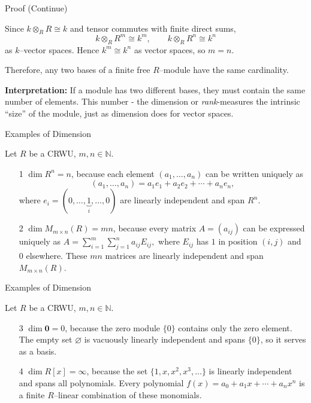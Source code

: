 \documentclass[11pt,aspectratio=43,ignorenonframetext,t]{beamer}
\begin{document}
\begin{frame}{Proof (Continue) }
\begin{block}{}
Since $k\otimes_R R \cong k$ and tensor commutes with finite direct sums,
\[
k \otimes_R R^m \cong k^m,\qquad k \otimes_R R^n \cong k^n
\]
as $k$–vector spaces. Hence $k^m \cong k^n$ as vector spaces, so $m=n$.

Therefore, any two bases of a finite free $R$–module have the same cardinality.     
\end{block}

\textbf{Interpretation:}  
If a module has two different bases, they must contain the same number of elements. This number - the dimension or \emph{rank}-measures the intrinsic “size” of the module, just as dimension does for vector spaces.


\end{frame}

\begin{frame}{Examples of Dimension}

\begin{block}{Let $R$ be a CRWU, $m,n\in\mathbb{N}$.}
    \begin{enumerate}
  \item[1] $\dim R^n = n$, because each element $(a_1,\dots,a_n)$ can be written uniquely as  
  \[
  (a_1,\dots,a_n) = a_1 e_1 + a_2 e_2 + \cdots + a_n e_n,
  \]
  where $e_i=(0,\dots,\underbrace{1}_{i},\dots,0)$ are linearly independent and span $R^n$.

  \item[2] $\dim M_{m\times n}(R) = mn$, because every matrix $A=(a_{ij})$ can be expressed uniquely as  
    $A = \sum_{i=1}^m \sum_{j=1}^n a_{ij}E_{ij},$
  where $E_{ij}$ has $1$ in position $(i,j)$ and $0$ elsewhere. These $mn$ matrices are linearly independent and span $M_{m\times n}(R)$.
\end{enumerate}
\end{block}
\end{frame}

\begin{frame}{Examples of Dimension}
\begin{block}{Let $R$ be a CRWU, $m,n\in\mathbb{N}$.}
\begin{enumerate}
  \item[3] $\dim \mathbf{0} = 0$, because the zero module $\{0\}$ contains only the zero element.  
  The empty set $\varnothing$ is vacuously linearly independent and spans $\{0\}$, so it serves as a basis.

  \item[4] $\dim R[x] = \infty$, because the set $\{1,x,x^2,x^3,\dots\}$ is linearly independent and spans all polynomials.  
  Every polynomial $f(x)=a_0+a_1x+\cdots+a_nx^n$ is a finite $R$–linear combination of these monomials.
\end{enumerate}    
\end{block}

\end{frame}
\end{document}

